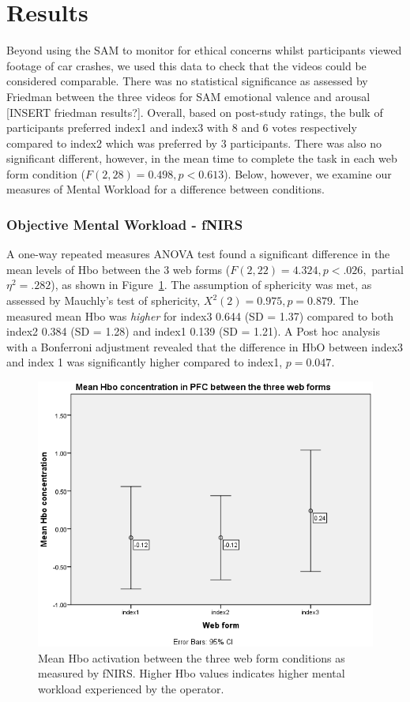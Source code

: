 \documentclass[../main/Feedback.tex]{subfiles}
\begin{document}
\section{Results}

Beyond using the SAM to monitor for ethical concerns whilst participants viewed footage of car crashes, we used this data to check that the videos could be considered comparable. There was no statistical significance as assessed by Friedman between the three videos for SAM emotional valence and arousal [INSERT friedman results?]. Overall, based on post-study ratings, the bulk of participants preferred index1 and index3 with 8 and 6 votes respectively compared to index2 which was preferred by 3 participants. There was also no significant different, however, in the mean time to complete the task in each web form condition ($F(2,28)=0.498, p<0.613$). Below, however, we examine our measures of Mental Workload for a difference between conditions.

		\subsubsection{Objective Mental Workload - fNIRS}
		A one-way repeated measures ANOVA test found a significant difference in the mean levels of Hbo between the 3 web forms ($F(2,22)=4.324, p<.026,$ partial $\eta^{2}=.282$), as shown in Figure~\ref{fig:mean-hbo-index123}. The assumption of sphericity was met, as assessed by Mauchly's test of sphericity, $X^{2}(2) = 0.975, p = 0.879$. The measured mean Hbo was \textit{higher} for index3 0.644 (SD = 1.37) compared to both index2 0.384 (SD = 1.28) and index1 0.139 (SD = 1.21). A Post hoc analysis with a Bonferroni adjustment revealed that the difference in HbO between index3 and index 1 was significantly higher compared to index1, $p=0.047$. 

		\begin{figure}[h]
			\centering
			\includegraphics[width=0.7\linewidth]{../figures/mean-hbo-index123}
			\caption[mean Hbo activation between the three web forms]{Mean Hbo activation between the three web form conditions as measured by fNIRS. Higher Hbo values indicates higher mental workload experienced by the operator.}
			\label{fig:mean-hbo-index123}
		\end{figure}
		
\end{document}
